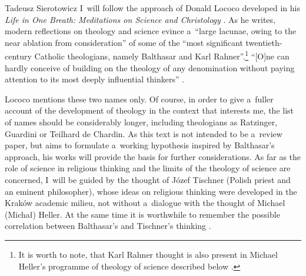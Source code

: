 \begin{artengenv}{Tadeusz Sierotowicz}
I~will follow the approach of Donald Lococo developed in his \textit{Life in One Breath: Meditations on Science and Christology} 
\parencite*[][]{lococo_life_2021}. %
 As he writes, modern reflections on theology and science evince a~``large lacunae, owing to the near ablation from consideration'' of some of the ``most significant twentieth-century Catholic theologians, namely Balthasar and Karl Rahner''.\footnote{It is worth to note, that Karl Rahner thought is also present in Michael Heller's programme of theology of science described below 
\parencites[cf][pp.80–81]{macek_teologia_2014}[][p.13]{maziarka_w_2016}. %
 } ``[O]ne can hardly conceive of building on the theology of any denomination without paying attention to its most deeply influential thinkers'' 
\parencite[][p.11]{lococo_life_2021}.%




Lococo mentions these two names only. Of course, in order to give a~fuller account of the development of theology in the context that interests me, the list of names should be considerably longer, including theologians as Ratzinger, Guardini or Teilhard de Chardin. As this text is not intended to be a~review paper, but aims to formulate a~working hypothesis inspired by Balthasar's approach, his works will provide the basis for further considerations. As far as the role of science in religious thinking and the limits of the theology of science are concerned, I~will be guided by the thought of Józef Tischner (Polish priest and an eminent philosopher), whose ideas on religious thinking were developed in the Kraków academic milieu, not without a~dialogue with the thought of Michael (Michał) Heller. At the same time it is worthwhile to remember the possible correlation between Balthasar's and Tischner's thinking 
\parencite[see][]{wolowski_problem_2019}.%





\end{artengenv}
